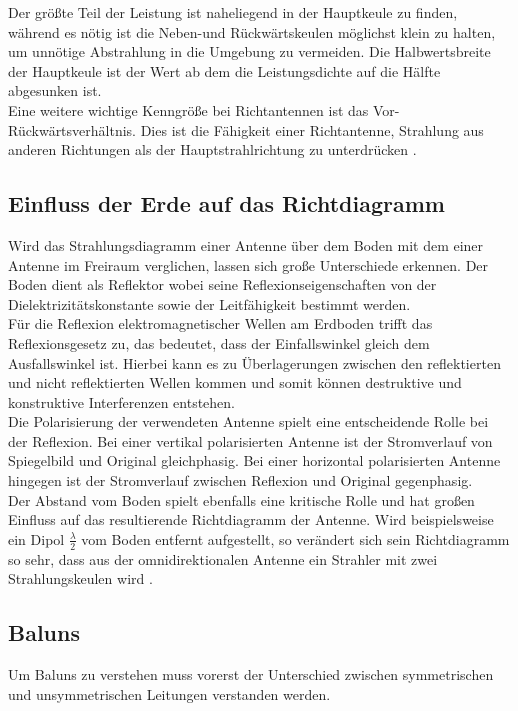 Der größte Teil der Leistung ist naheliegend in der Hauptkeule zu finden, während es nötig ist die Neben-und Rückwärtskeulen möglichst klein zu halten, um unnötige Abstrahlung in die Umgebung zu vermeiden. Die Halbwertsbreite der Hauptkeule ist der Wert ab dem die Leistungsdichte auf die Hälfte abgesunken ist.\\

Eine weitere wichtige Kenngröße bei Richtantennen ist das Vor-Rückwärtsverhältnis. Dies ist die Fähigkeit einer Richtantenne, Strahlung aus anderen Richtungen als der Hauptstrahlrichtung zu unterdrücken \cite{Kraus-2002-AntennasB}.

\subsection{Einfluss der Erde auf das Richtdiagramm}
Wird das Strahlungsdiagramm einer Antenne über dem Boden mit dem einer Antenne im Freiraum verglichen, lassen sich große Unterschiede erkennen. Der Boden dient als Reflektor wobei seine Reflexionseigenschaften von der Dielektrizitätskonstante sowie der Leitfähigkeit bestimmt werden.\\

Für die Reflexion elektromagnetischer Wellen am Erdboden trifft das Reflexionsgesetz zu, das bedeutet, dass der Einfallswinkel gleich dem Ausfallswinkel ist. Hierbei kann es zu Überlagerungen zwischen den reflektierten und nicht reflektierten Wellen kommen und somit können destruktive und konstruktive Interferenzen entstehen.\\

Die Polarisierung der verwendeten Antenne spielt eine entscheidende Rolle bei der Reflexion. Bei einer vertikal polarisierten Antenne ist der Stromverlauf von Spiegelbild und Original gleichphasig. Bei einer horizontal polarisierten Antenne hingegen ist der Stromverlauf zwischen Reflexion und Original gegenphasig.\\

Der Abstand vom Boden spielt ebenfalls eine kritische Rolle und hat großen Einfluss auf das resultierende Richtdiagramm der Antenne. Wird beispielsweise ein Dipol $\frac{\lambda}{2}$ vom Boden entfernt aufgestellt, so verändert sich sein Richtdiagramm so sehr, dass aus der omnidirektionalen Antenne ein Strahler mit zwei Strahlungskeulen wird \cite{Kraus-2002-AntennasB}. 


\subsection{Baluns}
\label{subsec:baluns}
Um Baluns zu verstehen muss vorerst der Unterschied zwischen symmetrischen und unsymmetrischen Leitungen verstanden werden. 

